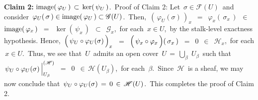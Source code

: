 \vskip 0.5cm
\noindent
\textbf{Claim 2:}\; $\textnormal{image}\!\left(\,\varphi_{U}\,\right) \,\subset\, \ker\!\left(\,\psi_{U}\,\right)$.\,
\vskip 0.2cm
\noindent
Proof of Claim 2:\;
Let \,$\sigma \in \mathscr{F}(U)$\, and consider
\,$\varphi_{U}(\,\sigma\,) \in \textnormal{image}\!\left(\,\varphi_{U}\,\right) \subset \mathscr{G}(U)$.\,
Then,
\,$\left(\,\varphi_{U}(\sigma)\,\right)_{x}$
\,$=$\, $\varphi_{x}(\,\sigma_{x}\,)$
\,$\in$\, $\textnormal{image}\!\left(\,\varphi_{x}\,\right)$
\,$=$\, $\ker\!\left(\,\psi_{x}\,\right)$
\,$\subset$\, $\mathscr{G}_{x}$,\,
for each \,$x \in U$,\, by the stalk-level exactness hypothesis.
Hence,
\,$\left(\,\psi_{U} \overset{{\color{white}1}}{\circ} \varphi_{U}(\sigma)\,\right)_{x}$
\,$=$\, $\left(\,\psi_{x} \overset{{\color{white}1}}{\circ} \varphi_{x}\,\right)\!(\,\sigma_{x}\,)$
\,$=$\, $0$
\,$\in$\, $\mathscr{H}_{x}$,\,
for each \,$x \in U$.\,
Thus, we see that \,$U$\, admits an open cover \,$U \,=\, \underset{\beta}{\bigcup}\;U_{\beta}$\,
such that
\,$\left.\psi_{U}\overset{{\color{white}1}}{\circ}\varphi_{U}(\sigma)\,\right\vert^{(\mathscr{H})}_{U_{\beta}}$
\,$=$\, $0$
\,$\in$\,$\mathscr{H}(U_{\beta})$,\,
for each \,$\beta$.\,
{\color{red}Since \,$\mathscr{H}$\, is a sheaf}, we may now conclude that
\,$\psi_{U}\overset{{\color{white}1}}{\circ}\varphi_{U}(\sigma) \,=\, 0 \,\in\, \mathscr{H}(U)$.\,
This completes the proof of Claim 2.



